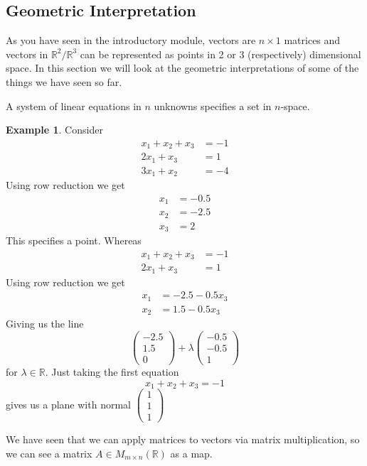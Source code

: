 \documentclass{report}
\theoremstyle{remark}
\theoremstyle{definition}
\theoremstyle{definition}
\newtheorem{example}[theorem]{Example}
\theoremstyle{theorem}
\begin{document}
\subsection{Geometric Interpretation}
As you have seen in the introductory module, vectors are $n \times 1$ matrices and vectors in $\mathbb{R}^2/\mathbb{R}^3$ can be represented as points in 2 or 3 (respectively) dimensional space. In this section we will look at the geometric interpretations of some of the things we have seen so far. \par
A system of linear equations in $n$ unknowns specifies a set in $n$-space.
\begin{example}
Consider 
\begin{align*}
    x_1 + x_2 + x_3 &=-1\\
    2 x_1 + x_3 &=1\\
    3 x_1 + x_2 &= -4
\end{align*}
Using row reduction we get
\begin{align*}
    x_1 &= -0.5\\
    x_2 &= -2.5\\
    x_3 &=2
\end{align*}
This specifies a point. Whereas
\begin{align*}
    x_1 + x_2 + x_3 &=-1\\
    2x_1 + x_3 &=1
\end{align*}
Using row reduction we get
\begin{align*}
    x_1 &= -2.5 - 0.5x_3\\
    x_2 &= 1.5 - 0.5x_3
\end{align*}
Giving us the line
\[\begin{pmatrix}
-2.5 \\ 1.5 \\0
\end{pmatrix} + \lambda \begin{pmatrix}
-0.5 \\ -0.5 \\ 1
\end{pmatrix} \]
for $ \lambda \in \mathbb{R}$.
Just taking the first equation 
\[x_1 + x_2 + x_3 = -1 \]
gives us a plane with normal $\begin{pmatrix} 1\\1\\1 \end{pmatrix}$
\end{example}
We have seen that we can apply matrices to vectors via matrix multiplication, so we can see a matrix $A \in M_{m \times n}(\mathbb{R})$ as a map.
\end{document}
